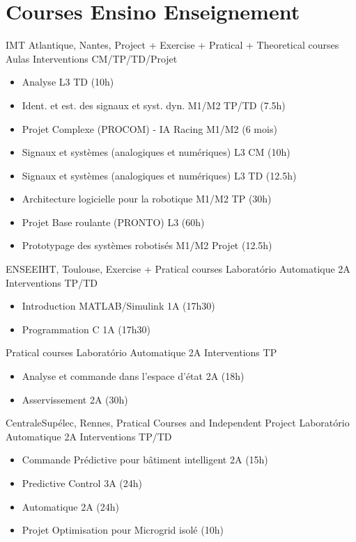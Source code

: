 \section{
  \ml
  {Courses}
  {Ensino}
  {Enseignement}
}
{IMT Atlantique, Nantes, \france}
{\newline \ml
  {Project + Exercise + Pratical + Theoretical courses}
  {Aulas}
  {Interventions CM/TP/TD/Projet}
}
{}
{}
{
  \begin{itemize}
    \item Analyse L3 TD (10h)
    \item Ident. et est. des signaux et syst. dyn. M1/M2 TP/TD (7.5h)
    \item Projet Complexe (PROCOM) - IA Racing M1/M2 (6 mois)
    \item Signaux et systèmes (analogiques et numériques) L3 CM  (10h)
    \item Signaux et systèmes (analogiques et numériques) L3 TD  (12.5h)
    \item Architecture logicielle pour la robotique M1/M2 TP (30h)
    \item Projet Base roulante (PRONTO)  L3 (60h)
    \item Prototypage des systèmes robotisés M1/M2 Projet (12.5h)
  \end{itemize}
}


{ENSEEIHT, Toulouse, \france}
{\newline \ml
  {Exercise + Pratical courses}
  {Laboratório Automatique 2A}
  {Interventions TP/TD}
}
{}
{}
{
    \begin{itemize}
    \item Introduction MATLAB/Simulink 1A (17h30)
    \item Programmation C 1A (17h30)
  \end{itemize}
}
{\newline
\ml
  {Pratical courses}
  {Laboratório Automatique 2A}
  {Interventions TP}}
{}
{}
{
  \begin{itemize}
    \item Analyse et commande dans l'espace d'état 2A (18h)
    \item Asservissement 2A (30h)
  \end{itemize}
}

{CentraleSupélec, Rennes, \france}
{\newline \ml
  {Pratical Courses and Independent Project}
  {Laboratório Automatique 2A}
  {Interventions TP/TD}}
{}
{}
{
  \begin{itemize}
    \item Commande Prédictive pour bâtiment intelligent 2A (15h)
    \item Predictive Control 3A (24h)
    \item Automatique 2A (24h)
    \item Projet Optimisation pour Microgrid isolé (10h)
  \end{itemize}
}

